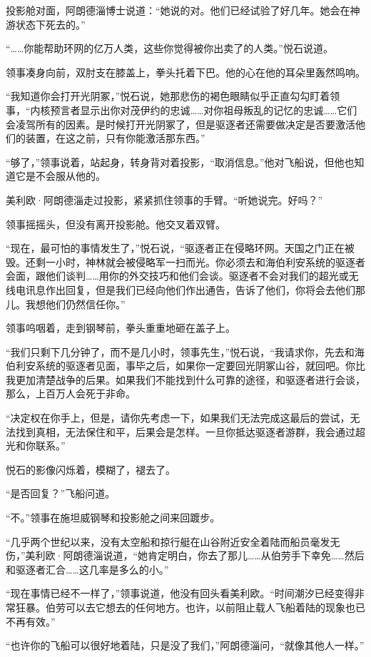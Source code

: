 \documentclass[AutoFakeBold=true]{book}
\begin{document}
投影舱对面，阿朗德淄博士说道：``她说的对。他们已经试验了好几年。她会在神游状态下死去的。''

``……你能帮助环网的亿万人类，这些你觉得被你出卖了的人类。''悦石说道。

领事凑身向前，双肘支在膝盖上，拳头托着下巴。他的心在他的耳朵里轰然鸣响。

``我知道你会打开光阴冢，''悦石说，她那悲伤的褐色眼睛似乎正直勾勾盯着领事，``内核预言者显示出你对茂伊约的忠诚……对你祖母叛乱的记忆的忠诚……它们会凌驾所有的因素。是时候打开光阴冢了，但是驱逐者还需要做决定是否要激活他们的装置，在这之前，只有你能激活那东西。''

``够了，''领事说着，站起身，转身背对着投影，``取消信息。''他对飞船说，但他也知道它是不会服从他的。

美利欧·阿朗德淄走过投影，紧紧抓住领事的手臂。``听她说完。好吗？''

领事摇摇头，但没有离开投影舱。他交叉着双臂。

``现在，最可怕的事情发生了，''悦石说，``驱逐者正在侵略环网。天国之门正在被毁。还剩一小时，神林就会被侵略军一扫而光。你必须去和海伯利安系统的驱逐者会面，跟他们谈判……用你的外交技巧和他们会谈。驱逐者不会对我们的超光或无线电讯息作出回复，但是我们已经向他们作出通告，告诉了他们，你将会去他们那儿。我想他们仍然信任你。''

领事呜咽着，走到钢琴前，拳头重重地砸在盖子上。

``我们只剩下几分钟了，而不是几小时，领事先生，''悦石说，``我请求你，先去和海伯利安系统的驱逐者见面，事毕之后，如果你一定要回光阴冢山谷，就回吧。你比我更加清楚战争的后果。如果我们不能找到什么可靠的途径，和驱逐者进行会谈，那么，上百万人会死于非命。

``决定权在你手上，但是，请你先考虑一下，如果我们无法完成这最后的尝试，无法找到真相，无法保住和平，后果会是怎样。一旦你抵达驱逐者游群，我会通过超光和你联系。''

悦石的影像闪烁着，模糊了，褪去了。

``是否回复？''飞船问道。

``不。''领事在施坦威钢琴和投影舱之间来回踱步。

``几乎两个世纪以来，没有太空船和掠行艇在山谷附近安全着陆而船员毫发无伤，''美利欧·阿朗德淄说道，``她肯定明白，你去了那儿……从伯劳手下幸免……然后和驱逐者汇合……这几率是多么的小。''

``现在事情已经不一样了，''领事说道，他没有回头看美利欧。``时间潮汐已经变得非常狂暴。伯劳可以去它想去的任何地方。也许，以前阻止载人飞船着陆的现象也已不再有效。''

``也许你的飞船可以很好地着陆，只是没了我们，''阿朗德淄问，``就像其他人一样。''
\end{document}
